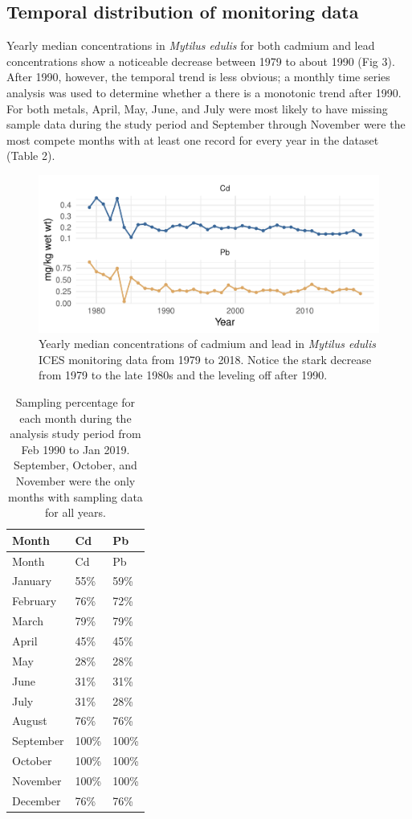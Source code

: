 \documentclass[
  12pt,
]{article}
\begin{document}
\hypertarget{temporal-distribution-of-monitoring-data}{%
\subsection{Temporal distribution of monitoring
data}\label{temporal-distribution-of-monitoring-data}}

Yearly median concentrations in \emph{Mytilus edulis} for both cadmium
and lead concentrations show a noticeable decrease between 1979 to about
1990 (Fig 3). After 1990, however, the temporal trend is less obvious; a
monthly time series analysis was used to determine whether a there is a
monotonic trend after 1990. For both metals, April, May, June, and July
were most likely to have missing sample data during the study period and
September through November were the most compete months with at least
one record for every year in the dataset (Table 2).

\begin{figure}
\centering
\includegraphics{McCrory_ENV972_Project_files/figure-latex/unnamed-chunk-3-1.pdf}
\caption{Yearly median concentrations of cadmium and lead in
\emph{Mytilus edulis} ICES monitoring data from 1979 to 2018. Notice the
stark decrease from 1979 to the late 1980s and the leveling off after
1990.}
\end{figure}

\begin{longtable}[]{@{}lll@{}}
\caption{Sampling percentage for each month during the analysis study
period from Feb 1990 to Jan 2019. September, October, and November were
the only months with sampling data for all years.}\tabularnewline
\toprule
Month & Cd & Pb\tabularnewline
\midrule
\endfirsthead
\toprule
Month & Cd & Pb\tabularnewline
\midrule
\endhead
January & 55\% & 59\%\tabularnewline
February & 76\% & 72\%\tabularnewline
March & 79\% & 79\%\tabularnewline
April & 45\% & 45\%\tabularnewline
May & 28\% & 28\%\tabularnewline
June & 31\% & 31\%\tabularnewline
July & 31\% & 28\%\tabularnewline
August & 76\% & 76\%\tabularnewline
September & 100\% & 100\%\tabularnewline
October & 100\% & 100\%\tabularnewline
November & 100\% & 100\%\tabularnewline
December & 76\% & 76\%\tabularnewline
\bottomrule
\end{longtable}
\end{document}
